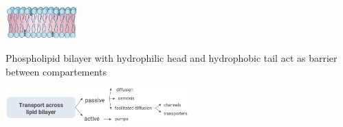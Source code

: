 
\begin{minipage}{0.40\linewidth}
    \includegraphics[width=28mm]{src/Images/cell_membrane.png}
\end{minipage}
\begin{minipage}{0.6\linewidth}
Phospholipid bilayer with hydrophilic head and hydrophobic tail act as barrier between compartements\\
\end{minipage}

\includegraphics[width=70mm]{src/Images/transport_across_bilayer.png}

